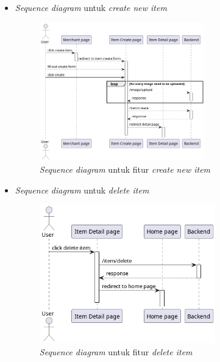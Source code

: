 \documentclass[a4paper]{article}
\begin{document}
\begin{enumerate}
\begin{enumerate}
\begin{itemize}
            \newpage
            \item \textit{Sequence diagram} untuk \textit{create new item}
            \begin{figure}[h]
                \centering
                \includegraphics*[height=6cm]{diagram/sequence diagram/FE/17. item/create item/create item.png}
                \caption{\textit{Sequence diagram} untuk fitur \textit{create new item}}
            \end{figure}

            \item \textit{Sequence diagram} untuk \textit{delete item}
            \begin{figure}[h]
                \centering
                \includegraphics*[height=6cm]{diagram/sequence diagram/FE/17. item/delete item/delete item.png}
                \caption{\textit{Sequence diagram} untuk fitur \textit{delete item}}
            \end{figure}


\end{itemize}
\end{enumerate}
\end{enumerate}
\end{document}
